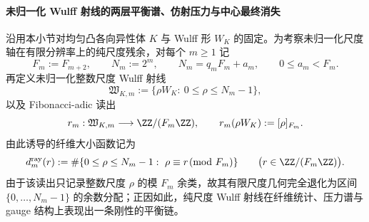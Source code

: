 \paragraph{未归一化 Wulff 射线的两层平衡谱、仿射压力与中心最终消失}
沿用本小节对均匀凸各向异性体 \(K\) 与 Wulff 形 \(W_K\) 的固定。为考察未归一化尺度轴在有限分辨率上的纯尺度残余，对每个 \(m\ge 1\) 记
\[
F_m:=F_{m+2},
\qquad
N_m:=2^m,
\qquad
N_m=q_mF_m+a_m,
\qquad
0\le a_m<F_m.
\]
再定义未归一化整数尺度 Wulff 射线
\[
\mathfrak W_{K,m}:=\{\rho W_K:\ 0\le \rho\le N_m-1\},
\]
以及 Fibonacci-adic 读出
\[
r_m:\mathfrak W_{K,m}\longrightarrow \ZZ/(F_m\ZZ),
\qquad
r_m(\rho W_K):=[\rho]_{F_m}.
\]
由此诱导的纤维大小函数记为
\[
d_m^{\mathrm{ray}}(r)
:=
\#\{0\le \rho\le N_m-1:\ \rho\equiv r\!\!\pmod{F_m}\}
\qquad
\bigl(r\in \ZZ/(F_m\ZZ)\bigr).
\]
由于该读出只记录整数尺度 \(\rho\) 的模 \(F_m\) 余类，故其有限尺度几何完全退化为区间 \(\{0,\dots,N_m-1\}\) 的余数分配；正因如此，纯尺度 Wulff 射线在纤维统计、压力谱与 gauge 结构上表现出一条刚性的平衡链。

